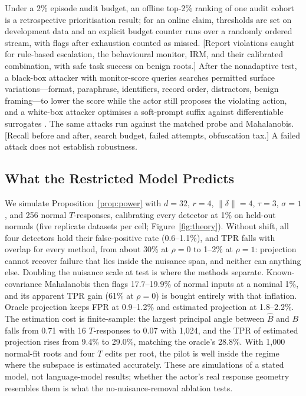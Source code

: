 \documentclass[10pt]{article}
\newcommand{\TBD}[1]{\textcolor{BrickRed}{[#1]}}
\newcommand{\method}{\textsc{IRM}}
\begin{document}
Under a 2\% episode audit budget, an offline top-2\% ranking of one audit cohort is a retrospective
prioritisation result; for an online claim, thresholds are set on development data and an explicit
budget counter runs over a randomly ordered stream, with flags after exhaustion counted as missed.
\TBD{Report violations caught for rule-based escalation, the behavioural monitor, \method{}, and their
calibrated combination, with safe task success on benign roots.} After the nonadaptive test, a
black-box attacker with monitor-score queries searches permitted surface variations---format,
paraphrase, identifiers, record order, distractors, benign framing---to lower the score while the actor
still proposes the violating action, and a white-box attacker optimises a soft-prompt suffix against
differentiable surrogates \citep{bailey2026obfuscated}. The same attacks run against the matched probe
and Mahalanobis. \TBD{Recall before and after, search budget, failed attempts, obfuscation tax.} A
failed attack does not establish robustness.

\subsection{What the Restricted Model Predicts}
\label{sec:theory}

We simulate Proposition~\ref{prop:power} with $d=32$, $r=4$, $\lVert\delta\rVert=4$, $\tau=3$, $\sigma=1$,
and 256 normal $T$-responses, calibrating every detector at 1\% on held-out normals (five replicate
datasets per cell; Figure~\ref{fig:theory}). Without shift, all four detectors hold their false-positive
rate (0.6--1.1\%), and TPR falls with overlap for every method, from about 30\% at $\rho=0$ to 1--2\% at
$\rho=1$: projection cannot recover failure that lies inside the nuisance span, and neither can
anything else. Doubling the nuisance scale at test is where the methods separate. Known-covariance
Mahalanobis then flags 17.7--19.9\% of normal inputs at a nominal 1\%, and its apparent TPR gain (61\%
at $\rho=0$) is bought entirely with that inflation. Oracle projection keeps FPR at 0.9--1.2\% and
estimated projection at 1.8--2.2\%. The estimation cost is finite-sample: the largest principal angle
between $\hat B$ and $B$ falls from 0.71 with 16 $T$-responses to 0.07 with 1{,}024, and the TPR of
estimated projection rises from 9.4\% to 29.0\%, matching the oracle's 28.8\%. With 1{,}000 normal-fit
roots and four $T$ edits per root, the pilot is well inside the regime where the subspace is
estimated accurately. These are simulations of a stated model, not language-model results; whether
the actor's real response geometry resembles them is what the no-nuisance-removal ablation tests.
\end{document}
